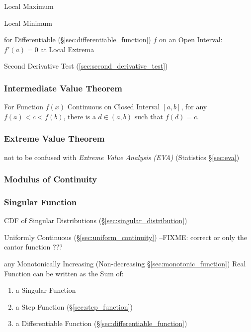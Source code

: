 Local Maximum

Local Minimum

for Differentiable (\S\ref{sec:differentiable_function}) $f$ on an
Open Interval: $f'(a) = 0$ at Local Extrema

\fist Second Derivative Test (\ref{sec:second_derivative_test})



\subsubsection{Intermediate Value Theorem}
\label{sec:intermediate_value}

For Function $f(x)$ Continuous on Closed Interval $[a,b]$, for any
$f(a) < c < f(b)$, there is a $d \in (a,b)$ such that $f(d) = c$.



\subsubsection{Extreme Value Theorem}\label{sec:extreme_value}

not to be confused with \emph{Extreme Value Analysis (EVA)} (Statistics
\S\ref{sec:eva})



\subsubsection{Modulus of Continuity}\label{sec:continuity_modulus}

\subsubsection{Singular Function}\label{sec:singular_function}

CDF of Singular Distributions (\S\ref{sec:singular_distribution})

Uniformly Continuous (\S\ref{sec:uniform_continuity})
--FIXME: correct or only the cantor function ???

any Monotonically Increasing (Non-decreasing \S\ref{sec:monotonic_function})
Real Function can be written as the Sum of:
\begin{enumerate}
  \item a Singular Function
  \item a Step Function (\S\ref{sec:step_function})
  \item a Differentiable Function (\S\ref{sec:differentiable_function})
\end{enumerate}



